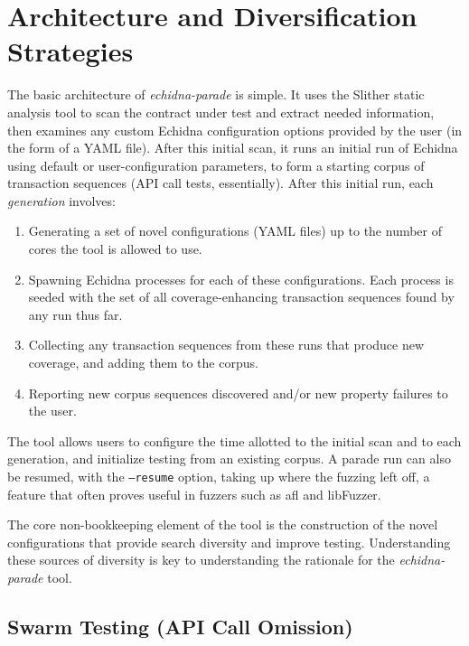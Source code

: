 \documentclass[sigconf]{acmart}
\begin{document}
{\section{Architecture and Diversification Strategies}

The basic architecture of \emph{echidna-parade} is simple.  It uses
the Slither static analysis tool to scan the contract under test and
extract needed information, then examines any custom Echidna
configuration options provided by the user (in the form of a YAML
file).  After this initial scan, it runs an initial run of Echidna
using default or user-configuration parameters, to form a starting
corpus of transaction sequences (API call tests, essentially).  After
this initial run, each \emph{generation} involves:

\begin{enumerate}
  \item Generating a set of novel configurations (YAML files) up to the
    number of cores the tool is allowed to use. 
    \item Spawning Echidna processes for each of these
      configurations.  Each process is seeded with the set of all
      coverage-enhancing transaction sequences found by any run thus far.
      \item Collecting any transaction sequences from these runs that
        produce new coverage, and adding them to the corpus.
        \item Reporting new corpus sequences discovered and/or new property failures to
          the user.
        \end{enumerate}

The tool allows users to configure the time allotted to the initial scan and to each generation, and initialize testing from an existing corpus.  A parade run can also be resumed, with the {\tt --resume} option, taking up where the fuzzing left off, a feature that often proves useful in fuzzers such as afl and libFuzzer.
        
The core non-bookkeeping element of the tool is the construction of the
novel configurations that provide search diversity and improve
testing.  Understanding these sources of diversity is key to
understanding the rationale for the \emph{echidna-parade} tool.

\subsection{Swarm Testing (API Call Omission)}

}
\end{document}
